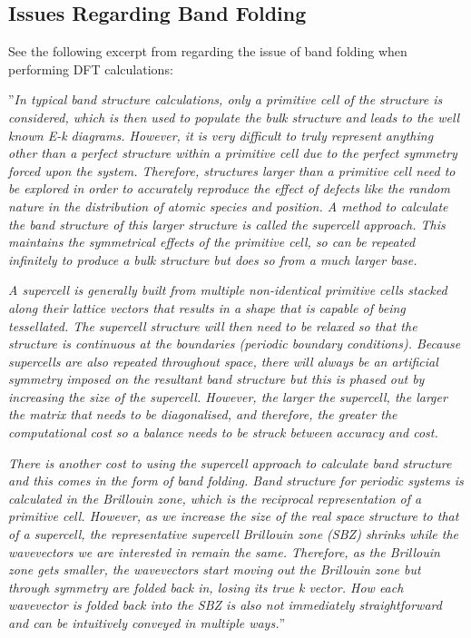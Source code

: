 \documentclass[]{article}
\begin{document}
\newpage
\subsection{Issues Regarding Band Folding}
See the following excerpt from \cite{band_folding_thesis} regarding the issue of band folding when performing DFT calculations:
\newline

''\textit{In typical band structure calculations, only a primitive cell of the structure is considered, which is then used to populate the bulk structure and leads to the well known
E-k diagrams. However, it is very difficult to truly represent anything other than a
perfect structure within a primitive cell due to the perfect symmetry forced upon the
system. Therefore, structures larger than a primitive cell need to be explored in order
to accurately reproduce the effect of defects like the random nature in the distribution
of atomic species and position. A method to calculate the band structure of this larger
structure is called the supercell approach. This maintains the symmetrical effects of the
primitive cell, so can be repeated infinitely to produce a bulk structure but does so from
a much larger base.}
\newline

\textit{A supercell is generally built from multiple non-identical primitive cells stacked along
their lattice vectors that results in a shape that is capable of being tessellated. The
supercell structure will then need to be relaxed so that the structure is continuous at
the boundaries (periodic boundary conditions). Because supercells are also repeated
throughout space, there will always be an artificial symmetry imposed on the resultant
band structure but this is phased out by increasing the size of the supercell. However, the
larger the supercell, the larger the matrix that needs to be diagonalised, and therefore,
the greater the computational cost so a balance needs to be struck between accuracy
and cost.}
\newline

\textit{There is another cost to using the supercell approach to calculate band structure and this comes in the form of band folding. Band structure for periodic systems is calculated in the Brillouin zone, which is the reciprocal representation of a primitive cell. However, as we increase the size of the real space structure to that of a supercell, the representative supercell Brillouin zone (SBZ) shrinks while the wavevectors we are interested in remain the same. Therefore, as the Brillouin zone gets smaller, the wavevectors start moving out the Brillouin zone but through symmetry are folded back in, losing its true k vector. How each wavevector is folded back into the SBZ is also not immediately straightforward and can be intuitively conveyed in multiple ways.}''
\newline
\end{document}
